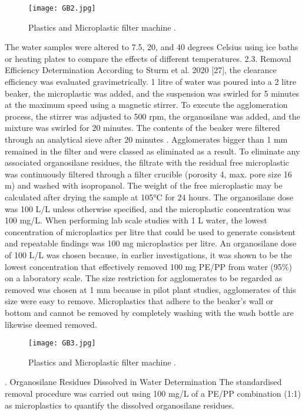\documentclass[12pt]{article}
\begin{document}
\begin{figure}[h]
\centering
\texttt{[image: GB2.jpg]}
\caption{Plastics and Microplastic filter machine .}
\label{fig_ROB}
\end{figure}
The water samples were altered to 7.5, 20, and 40 degrees Celsius using ice baths or heating plates to compare the effects of different temperatures. 2.3. Removal Efficiency Determination According to Sturm et al. 2020 [27], the clearance efficiency was evaluated gravimetrically. 1 litre of water was poured into a 2 litre beaker, the microplastic was added, and the suspension was swirled for 5 minutes at the maximum speed using a magnetic stirrer. To execute the agglomeration process, the stirrer was adjusted to 500 rpm, the organosilane was added, and the mixture was swirled for 20 minutes. The contents of the beaker were filtered through an analytical sieve after 20 minutes .
Agglomerates bigger than 1 mm remained in the filter and were classed as eliminated as a result. To eliminate any associated organosilane residues, the filtrate with the residual free microplastic was continuously filtered through a filter crucible (porosity 4, max. pore size 16 m) and washed with isopropanol. The weight of the free microplastic may be calculated after drying the sample at 105°C for 24 hours. The organosilane dose was 100 L/L unless otherwise specified, and the microplastic concentration was 100 mg/L. When performing lab scale studies with 1 L water, the lowest concentration of microplastics per litre that could be used to generate consistent and repeatable findings was 100 mg microplastics per litre.
An organosilane dose of 100 L/L was chosen because, in earlier investigations, it was shown to be the lowest concentration that effectively removed 100 mg PE/PP from water (95\%) on a laboratory scale. The size restriction for agglomerates to be regarded as removed was chosen at 1 mm because in pilot plant studies, agglomerates of this size were easy to remove. Microplastics that adhere to the beaker's wall or bottom and cannot be removed by completely washing with the wash bottle are likewise deemed removed. 
\begin{figure}[h]
\centering
\texttt{[image: GB3.jpg]}
\caption{Plastics and Microplastic filter machine .}
\label{fig_ROB}
\end{figure}
. Organosilane Residues Dissolved in Water Determination The standardised removal procedure was carried out using 100 mg/L of a PE/PP combination (1:1) as microplastics to quantify the dissolved organosilane residues.
\end{document}
